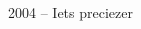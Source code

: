 \documentclass{beamer}
\begin{document}
\begin{frame}{2004 -- Iets preciezer}
\begin{columns}[t]
\begin{column}[T]{2.5cm}
\end{column}
\end{columns}
\centering
\end{frame}
\end{document}
